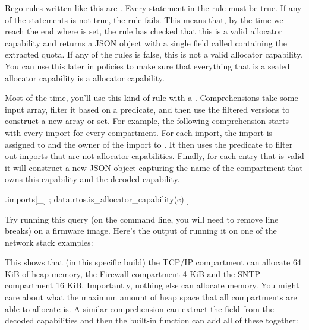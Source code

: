 {Rego rules written like this are .
Every statement in the rule must be true.
If any of the statements is not true, the rule fails.
This means that, by the time we reach the end where  is set, the rule has checked that this is a valid allocator capability and returns a JSON object with a single field called  containing the extracted quota.
If any of the rules is false, this is not a valid allocator capability.
You can use this later in policies to make sure that everything that is a sealed allocator capability is a  allocator capability.

Most of the time, you'll use this kind of rule with a .
Comprehensions take some input array, filter it based on a predicate, and then use the filtered versions to construct a new array or set.
For example, the following comprehension starts with every import for every compartment.
For each import, the import is assigned to  and the owner of the import to .
It then uses the  predicate to filter out imports that are not allocator capabilities.
Finally, for each entry that is valid it will construct a new JSON object capturing the name of the compartment that owns this capability and the decoded capability.

\begin{regosnippet}
[
	{
		"owner": owner, 
		"capability": data.rtos.decode_allocator_capability(c)
	\} |
	c = input.compartments[owner].imports[_] ;
	data.rtos.is_allocator_capability(c)
]
\end{regosnippet}

Try running this query (on the command line, you will need to remove line breaks) on a firmware image.
Here's the output of running it on one of the network stack examples:

\begin{jsonsnippet}
[
  {
    "capability": {
      "quota": 4096
    \},
    "owner": "Firewall"
  \},
  {
    "capability": {
      "quota": 16384
    \},
    "owner": "SNTP"
  \},
  {
    "capability": {
      "quota": 65536
    \},
    "owner": "TCPIP"
  \}
]
\end{jsonsnippet}

This shows that (in this specific build) the TCP/IP compartment can allocate 64 KiB of heap memory, the Firewall compartment 4 KiB and the SNTP compartment 16 KiB.
Importantly, nothing else can allocate memory.
You might care about what the maximum amount of heap space that all compartments are able to allocate is.
A similar comprehension can extract the  field from the decoded capabilities and then the built-in  function can add all of these together:

}
